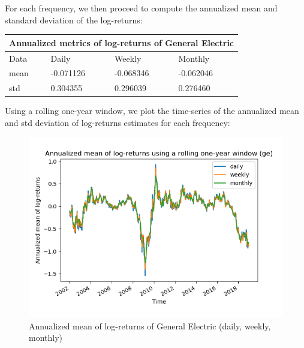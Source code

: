 \documentclass[10pt]{article}
\newenvironment{exercise}[2][Exercise]{\begin{trivlist}
  \item[\hskip \labelsep {\bfseries #1}\hskip \labelsep {\bfseries #2.}]}{\end{trivlist}}
\begin{document}
\begin{exercise}{4}
	\bigbreak	
	
	For each frequency, we then proceed to compute the annualized mean and standard deviation of the log-returns:
	
	\bigbreak
	
	\begin{tabular}{ |p{3cm}||p{3cm}|p{3cm}|p{3cm}|  }
		\hline
	 	\multicolumn{4}{|c|}{Annualized metrics of log-returns of General Electric} \\
	 	\hline
	 	Data & Daily & Weekly & Monthly\\
 		\hline
 		mean  &  -0.071126 & -0.068346 & -0.062046\\
 		std & 0.304355 & 0.296039 & 0.276460\\
 		\hline
	\end{tabular}
	
	\bigbreak	
	
	Using a rolling one-year window, we plot the time-series of the annualized mean and std deviation of log-returns estimates for each frequency:
	
	\begin{figure}[H]
	
		\centering
		\includegraphics[scale=0.5]{Figures/problem4d_mean_ge.png}	
		\caption{Annualized mean of log-returns of General Electric (daily, weekly, monthly)}	
		\label{fig:problem3d_men_ge}
	
	\end{figure}
	
	\begin{figure}[H]
	

\end{figure}
\end{exercise}
\end{document}

